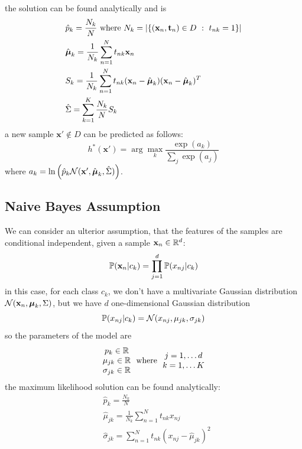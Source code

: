 \documentclass[10pt, letterpaper]{report}
\begin{document}
the solution can be found analytically and is\begin{align}
    &\hat p_k=\frac{N_k}{N}\text{ where }N_k=|\{(\mathbf x_n,\mathbf t_n)\in D \ : \ t_{nk}=1\}|\\
    &\hat{{\boldsymbol{\mu}}}_k=\frac{1}{N_k}\sum_{n=1}^Nt_{nk}\mathbf x_n\\ 
    &S_k=\frac{1}{N_k}\sum_{n=1}^Nt_{nk}(\mathbf x_n-\hat{{\boldsymbol{\mu}}}_k)(\mathbf x_n-\hat{{\boldsymbol{\mu}}}_k)^T\\
    &\hat \Sigma = \sum_{k=1}^{K}\frac{N_k}{N}S_k
\end{align}
a new sample $\mathbf x'\notin D$ can be predicted as follows:\begin{equation}
    h^*(\mathbf x')=\arg\max_k\frac{\exp(a_k)}{\sum_j\exp(a_j)}
\end{equation}
where $a_k=\ln\left(\hat p_k\mathcal N(\mathbf x',\hat{{\boldsymbol{\mu}}}_k,\hat\Sigma)\right)$.
\subsection{Naive Bayes Assumption}
We can consider an ulterior assumption, that the features of the samples are conditional independent, given a sample $\mathbf x_n\in {\mathbb R}^d$:\begin{equation}
    {\mathbb P}(\mathbf x_n|c_k)=\prod_{j=1}^d{\mathbb P}(x_{nj}|c_k)
\end{equation}
in this case, for each class $c_k$, we don't have a multivariate Gaussian distribution $\mathcal N(\mathbf x_n,{\boldsymbol{\mu}}_k,\Sigma)$, but we have $d$ one-dimensional Gaussian distribution\begin{equation}
    {\mathbb P}(x_{nj}|c_k)=\mathcal N(x_{nj},\mu_{jk},\sigma_{jk})
\end{equation}so the parameters of the model are
\begin{equation}
    \begin{matrix}
        p_k\in\R\\ 
        \mu_{jk}\in \R\\ 
        \sigma_{jk}\in \R
    \end{matrix} \ \text{ where } \ 
    \begin{matrix}
        j=1,\dots d\\ k=1,\dots K
    \end{matrix}
\end{equation}
the maximum likelihood solution can be found analytically:\begin{align}
    &\hat p_k=\frac{N_k}{N}\\ 
    &\hat\mu_{jk}=\frac{1}{N_k}\sum_{n=1}^Nt_{nk}x_{nj}\\
    &\hat\sigma_{jk}=\sum_{n=1}^Nt_{nk}(x_{nj}-\hat\mu_{jk})^2
\end{align}
\end{document}
